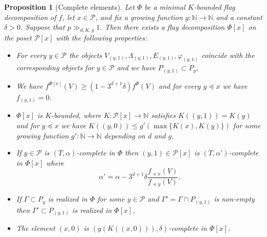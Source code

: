 \documentclass{daj}
\renewcommand{\le}{\leqslant}
\renewcommand{\ge}{\geqslant}
\newcommand{\N}{\mathbb N}
\renewcommand{\P}{\mathcal P}
\newtheorem{prop}[theorem]{Proposition}
\theoremstyle{definition}
\theoremstyle{remark}
\theoremstyle{definition}
\theoremstyle{definition}
\begin{document}
\begin{prop}[Complete elements] \label{oper2}
Let $\Phi$ be a minimal $K$-bounded flag decomposition of $f$, let $x \in \P$, and fix a growing function $g: \N \rightarrow \N$ and a constant $\delta > 0$. Suppose that $p \gg_{d, K, g} 1$. Then there exists a flag decomposition $\Phi[x]$ on the poset $\P[x]$ with the following properties:
\begin{itemize}
    \item For every $y \in \P$ the objects $V_{(y, 1)}, \Lambda_{(y, 1)}, E_{(y, 1)}, \varphi_{(y, 1)}$ coincide with the corresponding objects for $y \in \P$ and we have $P_{(y, 1)} \subset P_y$,
    \item We have $f^{\Phi[x]}(V) \ge (1-3^{d+1}\delta )f^{\Phi}(V)$ and for every $y\preceq x$ we have $f_{(y, 1)} = 0$.
    \item $\Phi[x]$ is $K$-bounded, where $K:\P[x] \rightarrow \N$ satisfies $K((y, 1)) = K(y)$ and for $y \preceq x$ we have $K((y, 0)) \le g'(\max\{K(x), K(y)\})$ for some growing function $g':\N\to \N$ depending on $d$ and $g$,
    \item If $y\in \P$ is $(T, \alpha)$-complete in $\Phi$ then $(y, 1) \in \P[x]$ is $(T, \alpha')$-complete in $\Phi[x]$ where 
    $$
    \alpha' = \alpha - 3^{d+1}\delta \frac{f_{\preceq x}(V)}{f_{\preceq y}(V)}.
    $$
    \item If $\Gamma \subset P_y$ is realized in $\Phi$ for some $y \in \P$ and $\Gamma' = \Gamma\cap P_{(y, 1)}$ is non-empty then $\Gamma' \subset P_{(y, 1)}$ is realized in $\Phi[x]$, 
    \item The element $(x, 0)$ is $(g(K((x,0))), \delta)$-complete in $\Phi[x]$. 
\end{itemize}
\end{prop}
\end{document}
